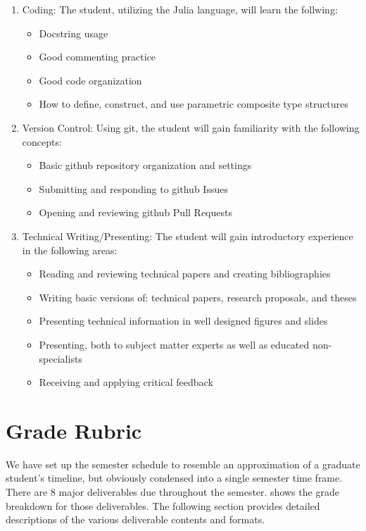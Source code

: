 \documentclass[12pt]{article}
\begin{document}
\begin{enumerate}
	\item Coding: The student, utilizing the Julia language, will learn the follwing:
	\begin{itemize}
		\item Docstring usage
		\item Good commenting practice
		\item Good code organization
		\item How to define, construct, and use parametric composite type structures
	\end{itemize}
	\item Version Control: Using git, the student will gain familiarity with the following concepts:
	\begin{itemize}
		\item Basic github repository organization and settings
		\item Submitting and responding to github Issues
		\item Opening and reviewing github Pull Requests
	\end{itemize}
	\item Technical Writing/Presenting: The student will gain introductory experience in the following areas:
	\begin{itemize}
		\item Reading and reviewing technical papers and creating bibliographies
		\item Writing basic versions of: technical papers, research proposals, and theses
		\item Presenting technical information in well designed figures and slides
		\item Presenting, both to subject matter experts as well as educated non-specialists
		\item Receiving and applying critical feedback
	\end{itemize}
\end{enumerate}





\section{Grade Rubric}
\label{sec:graderubric}

We have set up the semester schedule to resemble an approximation of a graduate student's timeline, but obviously condensed into a single semester time frame.
There are 8 major deliverables due throughout the semester.
 shows the grade breakdown for those deliverables.
The following section provides detailed descriptions of the various deliverable contents and formats.
\end{document}
